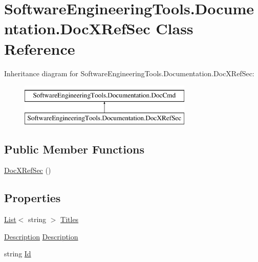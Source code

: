 \hypertarget{class_software_engineering_tools_1_1_documentation_1_1_doc_x_ref_sec}{\section{Software\+Engineering\+Tools.\+Documentation.\+Doc\+X\+Ref\+Sec Class Reference}
\label{class_software_engineering_tools_1_1_documentation_1_1_doc_x_ref_sec}
}
Inheritance diagram for Software\+Engineering\+Tools.\+Documentation.\+Doc\+X\+Ref\+Sec\+:\begin{figure}[H]
\begin{center}
\leavevmode
\includegraphics[height=2.000000cm]{class_software_engineering_tools_1_1_documentation_1_1_doc_x_ref_sec}
\end{center}
\end{figure}
\subsection*{Public Member Functions}
\begin{DoxyCompactItemize}
\item 
\hyperlink{class_software_engineering_tools_1_1_documentation_1_1_doc_x_ref_sec_a780d4b7764aaefd333d59084617bf638}{Doc\+X\+Ref\+Sec} ()
\end{DoxyCompactItemize}
\subsection*{Properties}
\begin{DoxyCompactItemize}
\item 
\hyperlink{namespace_software_engineering_tools_1_1_documentation_ae0bccf4f49a76db084c1c316e5954ec9a4ee29ca12c7d126654bd0e5275de6135}{List}$<$ string $>$ \hyperlink{class_software_engineering_tools_1_1_documentation_1_1_doc_x_ref_sec_ad5f128cab197b2d237a5d8481af6173a}{Titles}
\item 
\hyperlink{class_software_engineering_tools_1_1_documentation_1_1_description}{Description} \hyperlink{class_software_engineering_tools_1_1_documentation_1_1_doc_x_ref_sec_add4000dc0ebdf56c3b98e1c2041272c7}{Description}
\item 
string \hyperlink{class_software_engineering_tools_1_1_documentation_1_1_doc_x_ref_sec_ade8835c29857041292035ab076a75758}{Id}
\end{DoxyCompactItemize}



